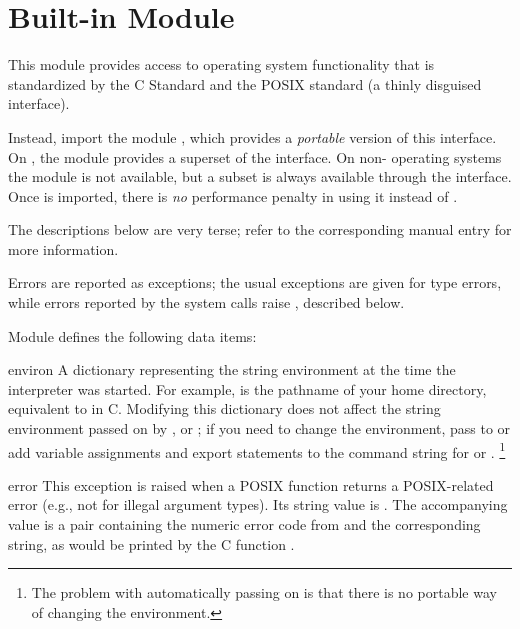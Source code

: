 \section{Built-in Module }

This module provides access to operating system functionality that is
standardized by the C Standard and the POSIX standard (a thinly disguised
\UNIX{} interface).

  Instead, import the
module , which provides a \emph{portable} version of this
interface.  On \UNIX{}, the  module provides a superset of
the  interface.  On non-\UNIX{} operating systems the
 module is not available, but a subset is always available
through the  interface.  Once  is imported, there is
\emph{no} performance penalty in using it instead of
.

The descriptions below are very terse; refer to the
corresponding \UNIX{} manual entry for more information.

Errors are reported as exceptions; the usual exceptions are given
for type errors, while errors reported by the system calls raise
, described below.

Module  defines the following data items:

\renewcommand{\indexsubitem}{(data in module posix)}
\begin{datadesc}{environ}
A dictionary representing the string environment at the time
the interpreter was started.
For example,
is the pathname of your home directory, equivalent to
in C.
Modifying this dictionary does not affect the string environment
passed on by ,  or ; if you
need to change the environment, pass  to 
or add variable assignments and export statements to the command
string for  or .%
\footnote{The problem with automatically passing on  is
that there is no portable way of changing the environment.}
\end{datadesc}

\renewcommand{\indexsubitem}{(exception in module posix)}
\begin{excdesc}{error}
This exception is raised when a POSIX function returns a
POSIX-related error (e.g., not for illegal argument types).  Its
string value is .  The accompanying value is a
pair containing the numeric error code from  and the
corresponding string, as would be printed by the C function
.
\end{excdesc}

